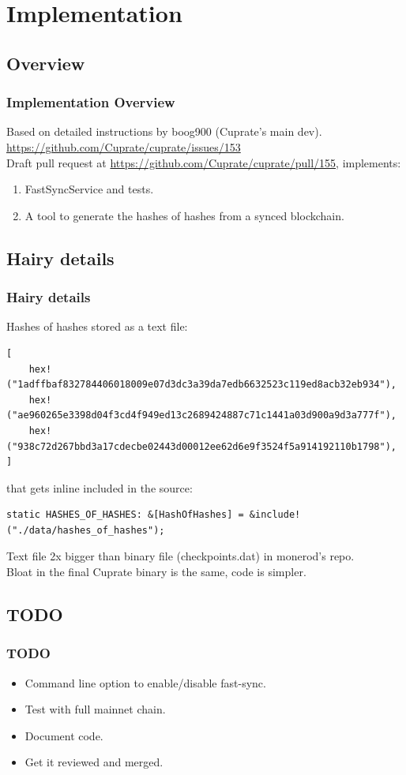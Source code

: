 \documentclass[aspectratio=169]{beamer}
\begin{document}
\section{Implementation}
\subsection{Overview}
\begin{frame}[fragile]
  \frametitle{Implementation Overview}
  Based on detailed instructions by boog900 (Cuprate's main dev).\\
  \url{https://github.com/Cuprate/cuprate/issues/153}\\
  \vspace{2\baselineskip}
  Draft pull request at \url{https://github.com/Cuprate/cuprate/pull/155}, implements:
  \begin{enumerate}
    \item FastSyncService and tests.\\
    \item A tool to generate the hashes of hashes from a synced blockchain.
  \end{enumerate}
\end{frame}

\subsection{Hairy details}
\begin{frame}[fragile]
  \frametitle{Hairy details}
  Hashes of hashes stored as a text file:
  \lstset{
    basicstyle=\tiny\ttfamily,
  }
  \begin{lstlisting}
[
	hex!("1adffbaf832784406018009e07d3dc3a39da7edb6632523c119ed8acb32eb934"),
	hex!("ae960265e3398d04f3cd4f949ed13c2689424887c71c1441a03d900a9d3a777f"),
	hex!("938c72d267bbd3a17cdecbe02443d00012ee62d6e9f3524f5a914192110b1798"),
]
  \end{lstlisting}
  that gets inline included in the source:
  \begin{lstlisting}
static HASHES_OF_HASHES: &[HashOfHashes] = &include!("./data/hashes_of_hashes");
  \end{lstlisting}
  Text file 2x bigger than binary file (checkpoints.dat) in monerod's repo.\\
  Bloat in the final Cuprate binary is the same, code is simpler.
\end{frame}

\subsection{TODO}
\begin{frame}[fragile]
  \frametitle{TODO}
  \begin{itemize}
    \item Command line option to enable/disable fast-sync.
    \item Test with full mainnet chain.
    \item Document code.
    \item Get it reviewed and merged.
  \end{itemize}
\end{frame}
\end{document}
